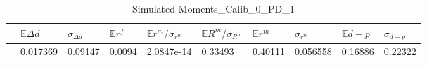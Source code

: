 \begin{table}[H]
\centering
\caption{Simulated Moments_Calib_0_PD_1}
\label{tab:MMoomme}
\begin{tabular}{@{}llllllllll@{}}
\toprule 
 & $\mathbb{E}\Delta d$ & $\sigma_{\Delta d}$ & $\mathbb{E}r^f$ & $\mathbb{E}r^m/\sigma _{r^m}$ & $\mathbb{E}R^m/\sigma _{R^m}$ & $\mathbb{E}r^m$ & $\sigma_{r^m}$ & $\mathbb{E}d-p$ & $\sigma_{d-p}$  \\ 
\midrule 
 & 0.017369 & 0.09147 & 0.0094 & 2.0847e-14 & 0.33493 & 0.40111 & 0.056558 & 0.16886 & 0.22322 \\ 
\bottomrule 
\end{tabular}
\end{table}

